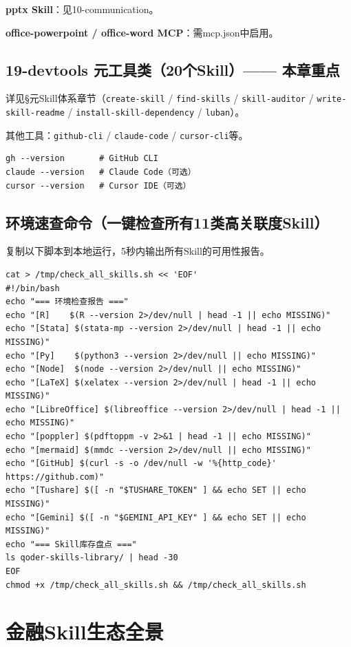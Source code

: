 \textbf{pptx Skill}：见10-communication。

\textbf{office-powerpoint / office-word MCP}：需mcp.json中启用。

\subsection{19-devtools 元工具类（20个Skill）—— 本章重点}
详见§元Skill体系章节（\texttt{create-skill} / \texttt{find-skills} / \texttt{skill-auditor} / \texttt{write-skill-readme} / \texttt{install-skill-dependency} / \texttt{luban}）。

其他工具：\texttt{github-cli} / \texttt{claude-code} / \texttt{cursor-cli}等。
\begin{lstlisting}[style=shell]
gh --version       # GitHub CLI
claude --version   # Claude Code（可选）
cursor --version   # Cursor IDE（可选）
\end{lstlisting}

\subsection{环境速查命令（一键检查所有11类高关联度Skill）}

复制以下脚本到本地运行，5秒内输出所有Skill的可用性报告。

\begin{lstlisting}[style=shell]
cat > /tmp/check_all_skills.sh << 'EOF'
#!/bin/bash
echo "=== 环境检查报告 ==="
echo "[R]    $(R --version 2>/dev/null | head -1 || echo MISSING)"
echo "[Stata] $(stata-mp --version 2>/dev/null | head -1 || echo MISSING)"
echo "[Py]    $(python3 --version 2>/dev/null || echo MISSING)"
echo "[Node]  $(node --version 2>/dev/null || echo MISSING)"
echo "[LaTeX] $(xelatex --version 2>/dev/null | head -1 || echo MISSING)"
echo "[LibreOffice] $(libreoffice --version 2>/dev/null | head -1 || echo MISSING)"
echo "[poppler] $(pdftoppm -v 2>&1 | head -1 || echo MISSING)"
echo "[mermaid] $(mmdc --version 2>/dev/null || echo MISSING)"
echo "[GitHub] $(curl -s -o /dev/null -w '%{http_code}' https://github.com)"
echo "[Tushare] $([ -n "$TUSHARE_TOKEN" ] && echo SET || echo MISSING)"
echo "[Gemini] $([ -n "$GEMINI_API_KEY" ] && echo SET || echo MISSING)"
echo "=== Skill库存盘点 ==="
ls qoder-skills-library/ | head -30
EOF
chmod +x /tmp/check_all_skills.sh && /tmp/check_all_skills.sh
\end{lstlisting}

\section{金融Skill生态全景}

